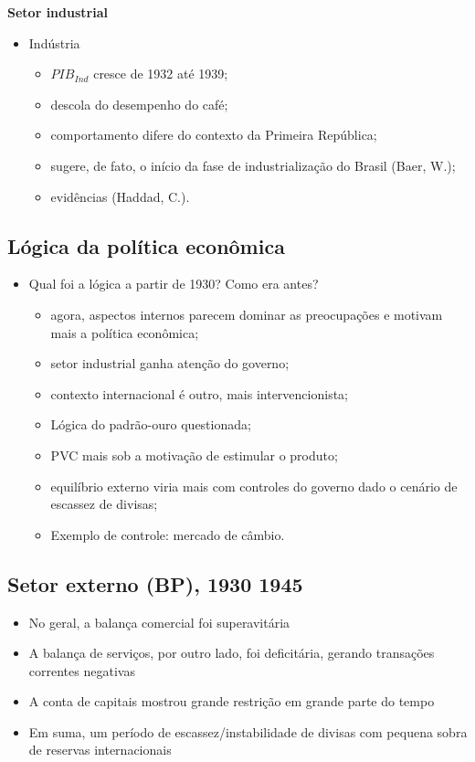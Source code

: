 \documentclass[a4paper,12pt]{article}[abntex2]
\begin{document}
{\textbf{Setor industrial}}
\begin{itemize}
    \item Indústria
    \begin{itemize}
        \item  $PIB_{Ind}$ cresce de 1932 até 1939;
        \item descola do desempenho do café;
        \item comportamento difere do contexto da Primeira República;
        \item sugere, de fato, o início da fase de industrialização do Brasil (Baer, W.);
        \item evidências (Haddad, C.).
    \end{itemize}
\end{itemize}

\subsection{{\textbf{Lógica da política econômica}}}
\begin{itemize}
    \item Qual foi a lógica a partir de 1930? Como era antes?
    \begin{itemize}
        \item agora, aspectos internos parecem dominar as preocupações e motivam mais a política econômica;
        \item setor industrial ganha atenção do governo;
        \item contexto internacional é outro, mais intervencionista;
        \item Lógica do padrão-ouro questionada;
        \item PVC mais sob a motivação de estimular o produto; 
        \item equilíbrio externo viria mais com controles do governo dado o cenário de escassez de divisas;
        \item Exemplo de controle: mercado de câmbio.
    \end{itemize}
\end{itemize}

\subsection{{\textbf{Setor externo (BP), 1930 1945}}}
\begin{itemize}
    \item No geral, a balança comercial foi superavitária
    \item A balança de serviços, por outro lado, foi deficitária, gerando transações correntes negativas
    \item A conta de capitais mostrou grande restrição em grande parte do tempo
    \item Em suma, um período de escassez/instabilidade de divisas com pequena sobra de reservas internacionais
\end{itemize}
\end{document}
